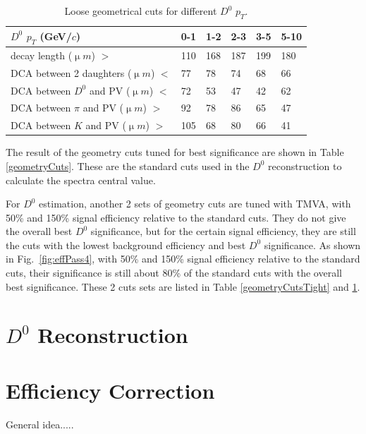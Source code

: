 \documentclass[a4paper]{article}
\begin{document}
\begin{table}[htp]
  \centering
  \caption{Loose geometrical cuts for different $D^0$ $p_T$.}
  \label{geometryCutsLoose}
  \begin{center}
    \begin{tabular}{l|l|l|l|l|l}
      $D^0$ $p_T$ (GeV/$c$) & 0-1 & 1-2 & 2-3 & 3-5 & 5-10\\ \hline
      decay length (${\upmu}m$) $>$ & 110 & 168 & 187 & 199 & 180\\ \hline
      DCA between 2 daughters (${\upmu}m$) $<$ & 77 & 78 & 74 & 68 & 66\\ \hline
      DCA between $D^0$ and PV (${\upmu}m$) $<$ & 72 & 53 & 47 & 42 & 62\\ \hline
      DCA between $\pi$ and PV (${\upmu}m$) $>$ & 92 & 78 & 86 & 65 & 47\\ \hline
      DCA between $K$ and PV (${\upmu}m$) $>$ & 105 & 68 & 80 & 66 & 41\\ \hline
    \end{tabular}
  \end{center}
\end{table}

The result of the geometry cuts tuned for best significance are shown in Table \ref{geometryCuts}. These are the standard cuts used in the $D^0$ reconstruction to calculate the spectra central value.

For $D^0$ estimation, another 2 sets of geometry cuts are tuned with TMVA, with 50\% and 150\% signal efficiency relative to the standard cuts. They do not give the overall best $D^0$ significance, but for the certain signal efficiency, they are still the cuts with the lowest background efficiency and best $D^0$ significance. As shown in Fig.~\ref{fig:effPass4}, with 50\% and 150\% signal efficiency relative to the standard cuts, their significance is still about 80\% of the standard cuts with the overall best significance. These 2 cuts sets are listed in Table \ref{geometryCutsTight} and \ref{geometryCutsLoose}.



\section{$D^0$ Reconstruction}

\section{Efficiency Correction}
General idea.....
\end{document}
